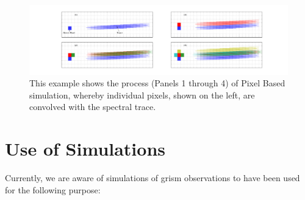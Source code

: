 \documentclass[preprint]{aastex}
\begin{document}
\begin{figure}[!ht]
\centering
\includegraphics[width=7.5in]{"Figures/pixel_sim"}
\caption{This example shows the process (Panels 1 through 4) of Pixel Based simulation, whereby individual pixels, shown on the left, are convolved with the spectral trace.}
\label{sim:2}
\end{figure}

\section{Use of Simulations}
Currently, we are aware of simulations of grism observations to have been used for the following purpose:
\end{document}
